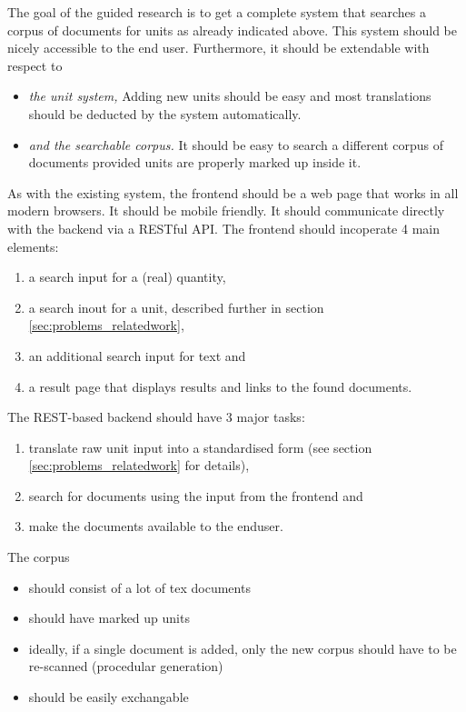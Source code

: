 \documentclass[11pt]{article}
\begin{document}
The goal of the guided research is to get a complete system that searches a corpus of documents for units as already indicated above. This system should be nicely accessible to the end user. Furthermore, it should be extendable with respect to
\begin{itemize}
  \item \textit{the unit system, } Adding new units should be easy and most translations should be deducted by the system automatically.
  \item \textit{and the searchable corpus. } It should be easy to search a different corpus of documents provided units are properly marked up inside it.
\end{itemize}

As with the existing system, the frontend should be a web page that works in all modern browsers. It should be mobile friendly. It should communicate directly with the backend via a RESTful API. The frontend should incoperate 4 main elements:

\begin{enumerate}
  \item a search input for a (real) quantity,
  \item a search inout for a unit, described further in section \ref{sec:problems_relatedwork},
  \item an additional search input for text and
  \item a result page that displays results and links to the found documents.
\end{enumerate}

\noindent The REST-based backend should have 3 major tasks:

\begin{enumerate}
  \item translate raw unit input into a standardised form (see section \ref{sec:problems_relatedwork} for details),
  \item search for documents using the input from the frontend and
  \item make the documents available to the enduser.
\end{enumerate}

\noindent The corpus 
\begin{itemize}
  \item should consist of a lot of tex documents
  \item should have marked up units
  \item ideally, if a single document is added, only the new corpus should have to be re-scanned (procedular generation)
  \item should be easily exchangable
\end{itemize}
\end{document}
